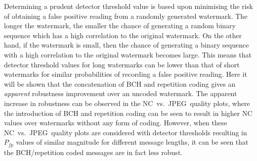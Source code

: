 \documentclass[12pt]{report}
\begin{document}
Determining a prudent detector threshold value is based upon minimising the risk of obtaining a false positive reading from a randomly generated 
watermark. The longer the watermark, the smaller the chance of generating a random binary sequence which has a high correlation
to the original watermark. On the other hand, if the watermark is small, then the chance of generating 
a binary sequence with a high correlation to the original watermark becomes large.
This means that detector threshold values for long watermarks can be lower than that of short watermarks for
similar probabilities of recording a false positive reading.
Here it will be shown that the concatenation of BCH and repetition coding gives an \emph{apparent} robustness improvement
over an uncoded watermark. The apparent increase in robustness can be observed in the NC~vs.~JPEG~quality plots, where the introduction
of BCH and repetition coding can be seen to result in higher NC values over watermarks without any form of coding. However, when these
NC~vs.~JPEG~quality plots are considered with detector thresholds resulting in $P_{fp}$ values of similar magnitude for different message
lengths, it can be seen that the BCH/repetition coded messages are in fact less robust.
\end{document}
